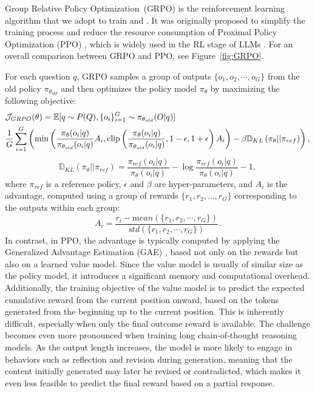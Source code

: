 Group Relative Policy Optimization~(GRPO) \citep{deepseekmath} is the reinforcement learning algorithm that we adopt to train \dsro{} and \dsri{}. It was originally proposed to simplify the training process and reduce the resource consumption of Proximal Policy Optimization (PPO) \citep{schulman2017proximal}, which is widely used in the RL stage of LLMs \citep{ouyang2022training}. For an overall comparison between GRPO and PPO, see Figure~\ref{fig:GRPO}. 

For each question $q$, GRPO samples a group of outputs $\{o_1, o_2, \cdots, o_G\}$ from the old policy $\pi_{\theta_{old}}$ and then optimizes the policy model $\pi_{\theta}$ by maximizing the following objective:
\begin{equation}
\begin{split}
    \footnotesize
    & \mathcal{J}_{GRPO}(\theta) = \mathbb{E}{[q \sim P(Q), \{o_i\}_{i=1}^G \sim \pi_{\theta_{old}}(O|q)]}  \\
    & \frac{1}{G}\sum_{i=1}^G \left( \min \left( \frac{\pi_\theta(o_i |q)}{\pi_{\theta_{old}}(o_i |q)} A_i, \text{clip} \left( \frac{\pi_\theta(o_i |q)}{\pi_{\theta_{old}}(o_i |q)}, 1 - \epsilon, 1 + \epsilon \right)  A_i \right) - \beta \mathbb{D}_{KL}\left(\pi_{\theta} || \pi_{ref}\right)\right) ,
\end{split}
\label{eq:GRPO-obj}
\end{equation}
\begin{equation}
    \mathbb{D}_{KL}\left(\pi_{\theta} || \pi_{ref}\right) = \frac{\pi_{ref}(o_i|q)}{\pi_{\theta}(o_i|q)}- \log\frac{\pi_{ref}(o_i|q)}{\pi_{\theta}(o_i|q)} - 1,
\end{equation}
where $\pi_{ref}$ is a reference policy, $\epsilon$ and $\beta$ are hyper-parameters, and $A_i$ is the advantage, computed using a group of rewards $\{r_1, r_2, \ldots, r_G\}$ corresponding to the outputs within each group:
\begin{equation}
    A_i = \frac{r_i - {\mathrm mean(\{r_1, r_2, \cdots, r_G\})}}{{\mathrm std(\{r_1, r_2, \cdots, r_G\})}}.
\end{equation}
In contrast, in PPO, the advantage is typically computed by applying the Generalized Advantage Estimation (GAE) \citep{gae}, based not only on the rewards but also on a learned value model. Since the value model is usually of similar size as the policy model, it introduces a significant memory and computational overhead. Additionally, the training objective of the value model is to predict the expected cumulative reward from the current position onward, based on the tokens generated from the beginning up to the current position. This is inherently difficult, especially when only the final outcome reward is available. The challenge becomes even more pronounced when training long chain-of-thought reasoning models. As the output length increases, the model is more likely to engage in behaviors such as reflection and revision during generation, meaning that the content initially generated may later be revised or contradicted, which makes it even less feasible to predict the final reward based on a partial response. 

